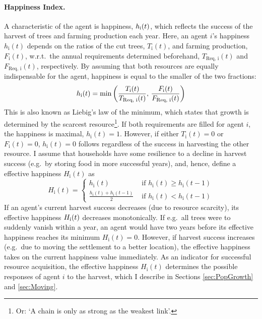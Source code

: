 \paragraph{Happiness Index.}
A characteristic of the agent is happiness, $h_{\rm i}(t)$, which reflects the success of the harvest of trees and farming production each year.
Here, an agent $i$'s happiness $h_\text{i}(t)$ depends on the ratios of the cut trees, $T_\text{i}(t)$, and farming production, $F_\text{i}(t)$, w.r.t.\ the annual requirements determined beforehand, $T_\text{Req, i}(t)$ and $F_\text{Req, i}(t)$, respectively.
By assuming that both resources are equally indispensable for the agent, happiness is equal to the smaller of the two fractions:
\begin{equation} 
h_\text{i}(t) = {\rm min} \left( \frac{T_\text{i}(t)}{T_\text{Req, i}(t)}, \, \frac{F_\text{i}(t)}{F_\text{Req, i}(t)} \right)
\label{eq:h_i}
\end{equation}
This is also known as Liebig's law of the minimum, which states that growth is determined by the scarcest resource\footnote{Or: `A chain is only as strong as the weakest link'.}.
If both requirements are filled for agent $i$, the happiness is maximal,  $h_\text{i}(t)=1$.
However, if either $T_\text{i}(t)=0$ or $F_\text{i}(t)=0$, $h_\text{i}(t)=0$ follows regardless of the success in harvesting the other resource.
I assume that households have some resilience to a decline in harvest success (e.g.\ by storing food in more successful years), and, hence, define a effective happiness $H_\text{i}(t)$ as
\begin{equation}
H_\text{i}(t) = \begin{cases} 
				h_\text{i}(t) & \text{ if } h_\text{i}(t)\geq h_\text{i}(t-1) \\
				\frac{h_\text{i}(t) + h_\text{i}(t-1)}{2} & \text{ if } h_\text{i}(t)<h_\text{i}(t-1) 
		\end{cases}
\end{equation}
If an agent's current harvest success decreases (due to resource scarcity), its effective happiness $H_{\rm i}(t)$ decreases monotonically.
If e.g.\ all trees were to suddenly vanish within a year, an agent would have two years before its effective happiness reaches its minimum $H_\text{i}(t) = 0$.
However, if harvest success increases (e.g.\ due to moving the settlement to a better location), the effective happiness takes on the current happiness value immediately.
As an indicator for successful resource acquisition, the effective happiness $H_\text{i}(t)$ determines the possible responses of agent $i$ to the harvest, which I describe in Sections \ref{sec:PopGrowth} and \ref{sec:Moving}.

